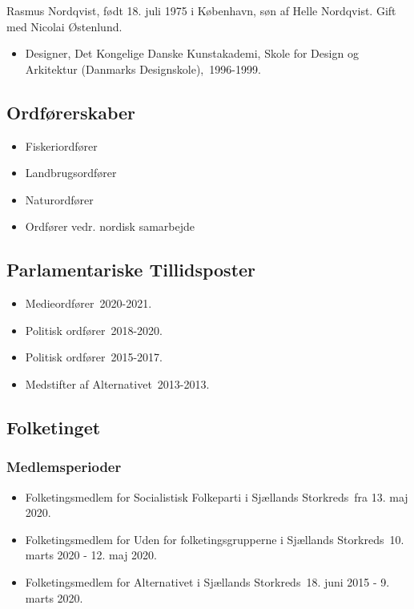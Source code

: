 \documentclass[11pt, a4paper]{awesome-cv}
\begin{document}
\makecvheader[R]
\makelettertitle
\begin{cvletter}
Rasmus Nordqvist, født 18. juli 1975 i København, søn af Helle Nordqvist. Gift med Nicolai Østenlund.

\begin{itemize}
\item Designer, Det Kongelige Danske Kunstakademi, Skole for Design og Arkitektur (Danmarks Designskole), 1996-1999.
\end{itemize}
\subsection*{Ordførerskaber}
\begin{itemize}
\item Fiskeriordfører
\item Landbrugsordfører
\item Naturordfører
\item Ordfører vedr. nordisk samarbejde
\end{itemize}
\subsection*{Parlamentariske Tillidsposter}
\begin{itemize}
\item Medieordfører 2020-2021.
\item Politisk ordfører 2018-2020.
\item Politisk ordfører 2015-2017.
\item Medstifter af Alternativet 2013-2013.
\end{itemize}
\subsection*{Folketinget}
\subsubsection*{Medlemsperioder}
\begin{itemize}
\item Folketingsmedlem for Socialistisk Folkeparti i Sjællands Storkreds fra 13. maj 2020.
\item Folketingsmedlem for Uden for folketingsgrupperne i Sjællands Storkreds 10. marts 2020 - 12. maj 2020.
\item Folketingsmedlem for Alternativet i Sjællands Storkreds 18. juni 2015 - 9. marts 2020.
\end{itemize}

\end{cvletter}
\end{document}
